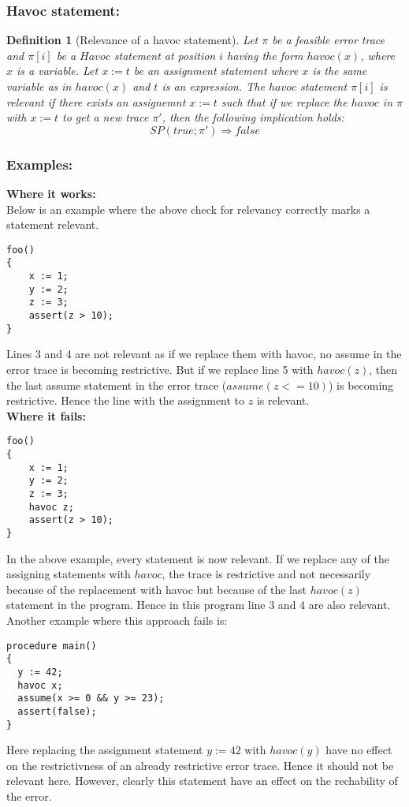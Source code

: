 \documentclass{article}
\newtheorem{mydef}{Definition}
\begin{document}
\subsubsection{Havoc statement:}
\begin{mydef}[Relevance of a havoc statement]
Let $\pi$ be a feasible error trace and $\pi[i]$ be a $Havoc$ statement at position $i$ having the form $havoc(x)$, where $x$ is a variable. Let $x:=t$ be an assignment statement where $x$ is the same variable as in $havoc(x)$ and $t$ is an expression. The $havoc$ statement $\pi[i]$ is relevant if there exists an assignemnt $x:=t$ such that if we replace the $havoc$ in $\pi$ with $x:=t$ to get a new trace $\pi'$, then the following implication holds:
$$SP(true; \pi') \Rightarrow false$$
\end{mydef}


\subsubsection{Examples:}
\textbf{Where it works:} \\
Below is an example where the above check for relevancy correctly marks a statement relevant.
\begin{lstlisting}
foo()
{
	x := 1;
	y := 2;
	z := 3;
	assert(z > 10);
}
\end{lstlisting}
Lines 3 and 4 are not relevant as if we replace them with havoc, no assume in the error trace is becoming restrictive. But if we replace line 5 with $havoc(z)$, then the last assume statement in the error trace ($assume(z<=10)$) is becoming restrictive. Hence the line with the assignment to $z$ is relevant. \\
\textbf{Where it fails:}
\begin{lstlisting}
foo()
{
	x := 1;
	y := 2;
	z := 3;
	havoc z;
	assert(z > 10);
}
\end{lstlisting}
In the above example, every statement is now relevant. If we replace any of the assigning statements with $havoc$, the trace is restrictive and not necessarily because of the replacement with havoc but because of the last $havoc(z)$ statement in the program. Hence in this program line 3 and 4 are also relevant.\\
Another example where this approach fails is:
\begin{lstlisting}
procedure main()
{
  y := 42;
  havoc x;
  assume(x >= 0 && y >= 23);
  assert(false);
}
\end{lstlisting}
Here replacing the assignment statement $y:=42$ with $havoc(y)$ have no effect on the restrictivness of an already restrictive error trace. Hence it should not be relevant here. However, clearly this statement have an effect on the rechability of the error.
\end{document}
